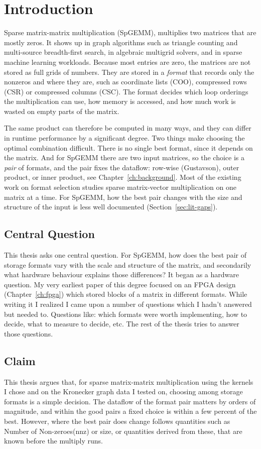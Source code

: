 \chapter{Introduction}

Sparse matrix-matrix multiplication (SpGEMM), multiplies two matrices that are mostly zeros. It shows up in graph algorithms such as triangle counting and multi-source breadth-first search, in algebraic multigrid solvers, and in sparse machine learning workloads. Because most entries are zero, the matrices are not stored as full grids of numbers. They are stored in a \emph{format} that records only the nonzeros and where they are, such as coordinate lists (COO), compressed rows (CSR) or compressed columns (CSC). The format decides which loop orderings the multiplication can use, how memory is accessed, and how much work is wasted on empty parts of the matrix.

The same product can therefore be computed in many ways, and they can differ in runtime performance by a significant degree. Two things make choosing the optimal combination difficult. There is no single best format, since it depends on the matrix. And for SpGEMM there are two input matrices, so the choice is a \emph{pair} of formats, and the pair fixes the dataflow: row-wise (Gustavson), outer product, or inner product, see Chapter~\ref{ch:background}. Most of the existing work on format selection studies sparse matrix-vector multiplication on one matrix at a time. For SpGEMM, how the best pair changes with the size and structure of the input is less well documented (Section~\ref{sec:lit-gaps}).

\section{Central Question}
This thesis asks one central question. For SpGEMM, how does the best pair of storage formats vary with the scale and structure of the matrix, and secondarily what hardware behaviour explains those differences? It began as a hardware question. My very earliest paper of this degree focused on an FPGA design (Chapter~\ref{ch:fpga}) which stored blocks of a matrix in different formats. While writing it I realized I came upon a number of questions which I hadn't answered but needed to. Questions like: which formats were worth implementing, how to decide, what to measure to decide, etc. The rest of the thesis tries to answer those questions.

\section{Claim}
This thesis argues that, for sparse matrix-matrix multiplication using the kernels I chose and on the Kronecker graph data I tested on, choosing among storage formats is a simple decision. The dataflow of the format pair matters by orders of magnitude, and within the good pairs a fixed choice is within a few percent of the best. However, where the best pair does change follows quantities such as Number of Non-zeroes(nnz) or size, or quantities derived from these, that are known before the multiply runs.

